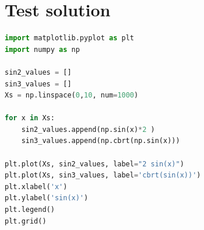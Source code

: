 \documentclass[12pt]{article}
\begin{document}
\clearpage
\appendix  
\section{Test solution}
\begin{lstlisting}[language=Python]
import matplotlib.pyplot as plt 
import numpy as np 

sin2_values = []
sin3_values = []
Xs = np.linspace(0,10, num=1000)

for x in Xs:
    sin2_values.append(np.sin(x)*2 )
    sin3_values.append(np.cbrt(np.sin(x)))

plt.plot(Xs, sin2_values, label="2 sin(x)")
plt.plot(Xs, sin3_values, label='cbrt(sin(x))')
plt.xlabel('x')
plt.ylabel('sin(x)')
plt.legend()
plt.grid()
\end{lstlisting}
\end{document}
